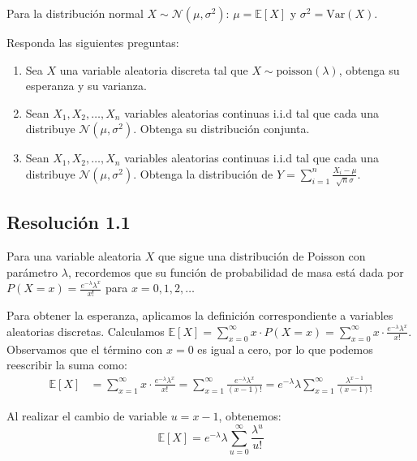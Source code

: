\documentclass[
  11pt,
  letterpaper,
   addpoints,
  answers
  ]{exam}
\begin{document}
Para la distribución normal $X \sim \mathcal{N}(\mu, \sigma^2)$: $\mu = \mathbb{E}[X]$ y $\sigma^2 = \text{Var}(X)$.
\newpage
\begin{questions}
  \question Responda las siguientes preguntas:
  \begin{enumerate}
    \item Sea $X$ una variable aleatoria discreta tal que $X \sim \text{poisson}(\lambda)$, obtenga su esperanza y su varianza.
    
    \item Sean $X_1, X_2, \ldots, X_n$ variables aleatorias continuas i.i.d tal que cada una distribuye $\mathcal{N}(\mu, \sigma^2)$. Obtenga su distribución conjunta.
    
    \item Sean $X_1, X_2, \ldots, X_n$ variables aleatorias continuas i.i.d tal que cada una distribuye $\mathcal{N}(\mu, \sigma^2)$. Obtenga la distribución de $Y = \sum_{i=1}^{n} \frac{X_i - \mu}{\sqrt{n}\sigma}$.
  \end{enumerate}
\begin{solution}
  \subsection*{Resolución 1.1}
  
  Para una variable aleatoria $X$ que sigue una distribución de Poisson con parámetro $\lambda$, recordemos que su función de probabilidad de masa está dada por $P(X = x) = \frac{e^{-\lambda} \lambda^x}{x!}$ para $x = 0, 1, 2, \ldots$
  
  Para obtener la esperanza, aplicamos la definición correspondiente a variables aleatorias discretas. Calculamos $\mathbb{E}[X] = \sum_{x=0}^{\infty} x \cdot P(X = x) = \sum_{x=0}^{\infty} x \cdot \frac{e^{-\lambda} \lambda^x}{x!}$. Observamos que el término con $x = 0$ es igual a cero, por lo que podemos reescribir la suma como:
  \begin{align}
  \mathbb{E}[X] &= \sum_{x=1}^{\infty} x \cdot \frac{e^{-\lambda} \lambda^x}{x!} = \sum_{x=1}^{\infty} \frac{e^{-\lambda} \lambda^x}{(x-1)!} = e^{-\lambda} \lambda \sum_{x=1}^{\infty} \frac{\lambda^{x-1}}{(x-1)!}
  \end{align}
  
  Al realizar el cambio de variable $u = x - 1$, obtenemos:
  \begin{equation}
  \mathbb{E}[X] = e^{-\lambda} \lambda \sum_{u=0}^{\infty} \frac{\lambda^u}{u!}
  \end{equation}
  

\end{solution}
\end{questions}
\end{document}
